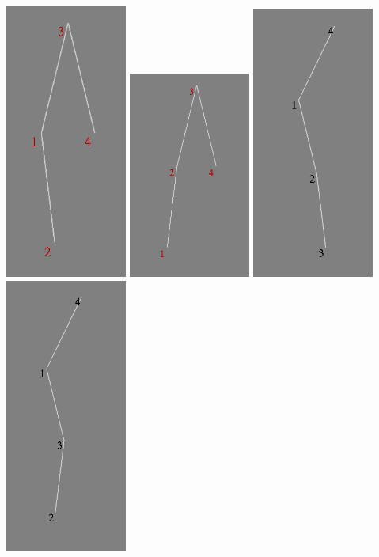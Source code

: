 \documentclass{ltjsarticle}
\begin{document}
\includegraphics[width=4cm]{9.png}
\includegraphics[width=4cm]{10.png}
\includegraphics[width=4cm]{11.png}
\includegraphics[width=4cm]{12.png}
\end{document}
